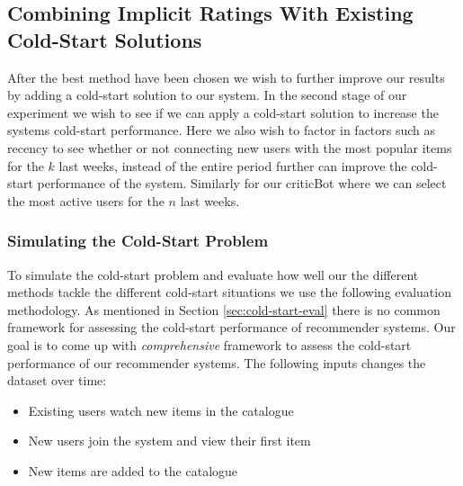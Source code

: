 
\subsection{Combining Implicit Ratings With Existing Cold-Start Solutions}


After the best method have been chosen we wish to further improve our results
by adding a cold-start solution to our system. In the second stage of our
experiment we wish to see if we can apply a cold-start solution to increase the
systems cold-start performance.  Here we also wish to factor in factors such as
recency to see whether or not connecting new users with the most popular items
for the $k$ last weeks, instead of the entire period further can improve the
cold-start performance of the system. Similarly for our criticBot where we
can select the most active users for the $n$ last weeks.

\subsubsection{Simulating the Cold-Start Problem}

To simulate the cold-start problem and evaluate how well our the different
methods tackle the different cold-start situations we use the following
evaluation methodology. As mentioned in Section \ref{sec:cold-start-eval} there
is no common framework for assessing the cold-start performance of recommender
systems.  Our goal is to come up with \emph{comprehensive} framework to assess
the cold-start performance of our recommender systems. The following inputs
changes the dataset over time:

\begin{itemize}
	\item 	Existing users watch new items in the catalogue
	\item	New users join the system and view their first item
	\item	New items are added to the catalogue
\end{itemize}

